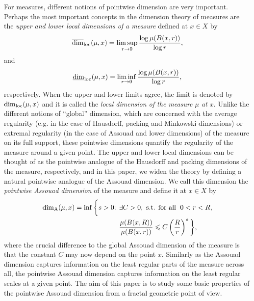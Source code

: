 \documentclass{PRM}
\newcommand{\updim}{\overline{\dim}}
\newcommand{\lowdim}{\underline{\dim}}
\newcommand{\adim}{\dim_{\mathrm{A}}}
\theoremstyle{plain}
\theoremstyle{definition}
\theoremstyle{remark}
\begin{document}
For measures, different notions of pointwise dimension are very important. Perhaps the most important concepts in the dimension theory of measures are the \emph{upper and lower local dimensions of a measure} defined at $x\in X$ by
\begin{equation*}
    \updim_{\textnormal{loc}}(\mu,x)=\limsup_{r\to 0}\frac{\log \mu(B(x,r))}{\log r},
\end{equation*}
and
\begin{equation*}
    \lowdim_{\textnormal{loc}}(\mu,x)=\liminf_{r\to 0}\frac{\log \mu(B(x,r))}{\log r},
\end{equation*}
respectively. When the upper and lower limits agree, the limit is denoted by $\dim_{\textnormal{loc}}(\mu,x)$ and it is called the \emph{local dimension of the measure $\mu$ at $x$}. Unlike the different notions of ``global'' dimension, which are concerned with the average regularity (e.g. in the case of Hausdorff, packing and Minkowski dimensions) or extremal regularity (in the case of Assouad and lower dimensions) of the measure on its full support, these pointwise dimensions quantify the regularity of the measure around a given point. The upper and lower local dimensions can be thought of as the pointwise analogue of the Hausdorff and packing dimensions of the measure, respectively, and in this paper, we widen the theory by defining a natural pointwise analogue of the Assouad dimension. We call this dimension the \emph{pointwise Assouad dimension} of the measure and define it at $x\in X$ by
\begin{align*}
    \adim (\mu,x)=\inf\bigg\{ s>0\colon& \exists C>0,\textnormal{ s.t. for all }\; 0<r<R,\\
    &\frac{\mu(B(x,R))}{\mu(B(x,r))}\leq C\left(\frac{R}{r}\right)^s\bigg\},
\end{align*}
where the crucial difference to the global Assouad dimension of the measure is that the constant $C$ may now depend on the point $x$. Similarly as the Assouad dimension captures information on the least regular parts of the measure across all, the pointwise Assouad dimension captures information on the least regular scales at a given point. The aim of this paper is to study some basic properties of the pointwise Assouad dimension from a fractal geometric point of view.
\end{document}
